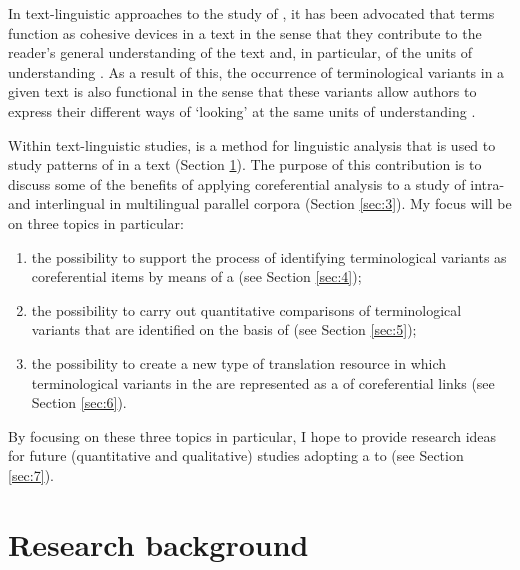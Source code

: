 \documentclass[output=paper]{langsci/langscibook.cls}
\begin{document}
In text-linguistic approaches to the study of  \citep{Collet2004}, it has 
been advocated that terms function as cohesive devices in a text in the sense that 
they contribute to the reader's general understanding of the text and, in particular, 
of the units of understanding \citep{Temmerman2000}. As a result of this, the occurrence 
of terminological variants in a given text is also functional in the sense that 
these variants allow authors to express their different ways of `looking' at the 
same units of understanding \citep{Cabre2008,FreixaEtAl2008,FernandezSilva2010}. 

Within text-linguistic studies,  is a method for linguistic 
analysis that is used to study patterns of  in a text (Section \ref{sec:2}). The 
purpose of this contribution is to discuss some of the benefits of applying coreferential 
analysis to a study of intra- and interlingual  in multilingual 
parallel corpora (Section \ref{sec:3}). My focus will be on three topics in particular: 
 
\begin{enumerate}
\item  the possibility to support the process of identifying terminological variants 
as coreferential items by means of a  (see Section \ref{sec:4}); 

\item the possibility to carry out quantitative comparisons of terminological variants 
that are identified on the basis of  (see Section \ref{sec:5});

\item the possibility to create a new type of translation resource in which terminological 
variants in the  are represented as a  of coreferential links 
(see Section \ref{sec:6}).
\end{enumerate}

By focusing on these three topics in particular, I hope to provide research ideas 
for future (quantitative and qualitative) studies adopting a  
to  (see Section \ref{sec:7}).\label{HRef445070813}

\section{Research background}\label{sec:2}
\end{document}

